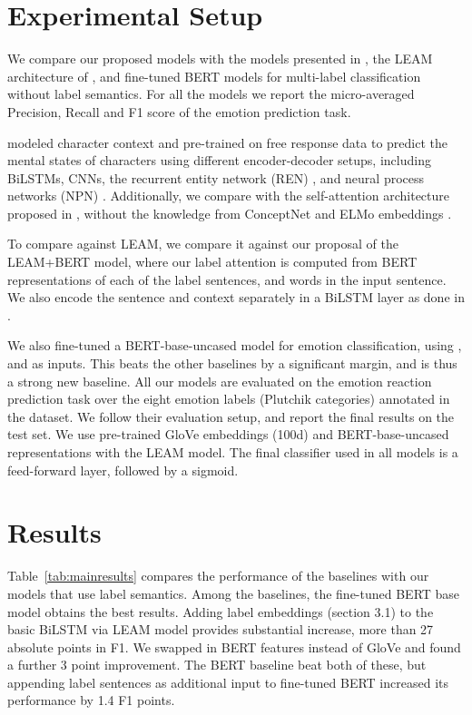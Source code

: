 \documentclass[11pt,a4paper]{article}
\begin{document}
\section{Experimental Setup}
\label{sec:baseline}

\noindent We compare our proposed models with the models presented in \citet{rashkin2018modeling}, the LEAM architecture of \citet{wang2018joint}, and fine-tuned BERT models \cite{devlin-etal-2019-bert} for multi-label classification without label semantics. For all the models we report the micro-averaged Precision, Recall and F1 score of the emotion prediction task.

\citet{rashkin2018modeling} modeled character context and pre-trained on free response data to predict the mental states of characters using different encoder-decoder setups, including BiLSTMs, CNNs, the recurrent entity network (REN) \cite{henaff2016tracking}, and neural process networks (NPN) \cite{bosselut2017simulating}.
Additionally, we compare with the self-attention architecture proposed in \cite{paulfrank:2019}, without the knowledge from ConceptNet \cite{speer-havasi-2012-representing} and ELMo embeddings \cite{Peters2018DeepCW}.

To compare against LEAM, we compare it against our proposal of the LEAM+BERT model, where our label attention is computed from BERT representations of each of the label sentences, and words in the input sentence. We also encode the sentence and context separately in a BiLSTM layer as done in \citet{rashkin2018modeling}.

We also fine-tuned a BERT-base-uncased model for emotion classification, using ,  and  as inputs. This beats the other baselines by a significant margin, and is thus a strong new baseline. All our models are evaluated on the emotion reaction prediction task over the eight emotion labels (Plutchik categories) annotated in the \citet{rashkin2018modeling} dataset. We follow their evaluation setup, and report the final results on the test set. We use pre-trained GloVe embeddings (100d) and BERT-base-uncased representations with the LEAM model. The final classifier used in all models is a feed-forward layer, followed by a sigmoid. \section{Results}
Table~\ref{tab:mainresults} compares the performance of the baselines with our models that use label semantics. Among the baselines, the fine-tuned BERT base model obtains the best results. Adding label embeddings (section 3.1) to the basic BiLSTM via LEAM model provides substantial increase, more than 27 absolute points in F1. We swapped in BERT features instead of GloVe and found a further 3 point improvement. 
The BERT baseline beat both of these, but appending label sentences as additional input to fine-tuned BERT increased its performance by 1.4 F1 points.
\end{document}
